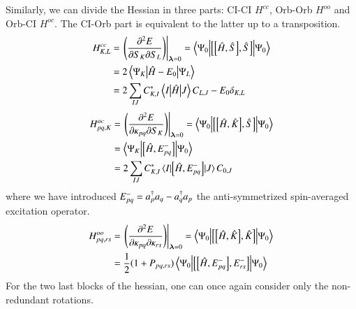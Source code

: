 \documentclass[aps,prb,reprint,showkeys,superscriptaddress]{revtex4-1}
\begin{document}
Similarly, we can divide the Hessian in three parts: CI-CI $H^{cc}$, Orb-Orb $H^{oo}$ and Orb-CI $H^{oc}$. The CI-Orb part is equivalent to the latter up to a transposition.
\begin{align}
  \label{eq:CASSCF_CICI_Hessian}
  H^{cc}_{K,L} &= \eval{\mleft(\pdv{E}{S_{K}}{S_{L}}\mright)}_{\bm{\lambda}=0} = \mel**{\Psi_0}{\com{\com{\hH}{\hS}}{\hS}}{\Psi_0} \\
  &= 2\mel**{\Psi_K}{\hH - E_0}{\Psi_L} \notag \\
  &= 2\sum_{IJ}C_{K,I}^*\mel**{I}{\hH}{J}C_{L,J} - E_0\delta_{K,L} \notag
\end{align}
\begin{align}
  \label{eq:CASSCF_OrbCI_Hessian}
  H^{oc}_{pq,K} &= \eval{\mleft(\pdv{E}{\kappa_{pq}}{S_{K}}\mright)}_{\bm{\lambda}=0} = \mel**{\Psi_0}{\com{\com{\hH}{\hK}}{\hS}}{\Psi_0} \\
                &= \mel**{\Psi_K}{\com{\hH}{E_{pq}^-}}{\Psi_0} \notag \\
                &= 2\sum_{IJ}C_{K,I}^*\mel{I}{\com{\hH}{E_{pq}^-}}{J}C_{0,J} \notag
\end{align}
where we have introduced $E_{pq}^- = a_{p}^\dagger a_{q} - a_{q}^\dagger a_{p}$ the anti-symmetrized spin-averaged excitation operator.
\begin{align}
  \label{eq:MCSCF_SO_OrbOrb_Hessian}
  H^{oo}_{pq,rs} &= \eval{\mleft(\pdv{E}{\kappa_{pq}}{\kappa_{rs}}\mright)}_{\bm{\lambda}=0} = \mel**{\Psi_0}{\com{\com{\hH}{\hK}}{\hK}}{\Psi_0} \\
                   &= \frac{1}{2}(1+P_{pq,rs})\mel**{\Psi_0}{\com{\com{\hH}{E_{pq}^-}}{E_{rs}^-}}{\Psi_0} \notag
\end{align}
For the two last blocks of the hessian, one can once again consider only the non-redundant rotations.
\end{document}
